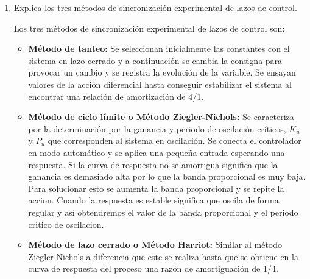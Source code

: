 \documentclass[10pt,a4paper,spanish]{article}
\begin{document}
\begin{enumerate}
    \item Explica los tres métodos de sincronización experimental de lazos de control.

    \noindent
    Los tres métodos de sincronización experimental de lazos de control son:

    \begin{itemize}
      \item \textbf{Método de tanteo:} Se seleccionan inicialmente las constantes con el sistema en lazo cerrado y a continuación se cambia la consigna para provocar un cambio y se registra la evolución de la variable. Se ensayan valores de la acción diferencial hasta conseguir estabilizar el sistema al encontrar una relación de amortización de 4/1.

      \item \textbf{Método de ciclo límite o Método Ziegler-Nichols:} Se caracteriza por la determinación por la ganancia y periodo de oscilación críticos, $K_u$ y $P_u$ que corresponden al sistema en oscilación. Se conecta el controlador en modo automático y se aplica una pequeña entrada esperando una respuesta. Si la curva de respuesta no se amortigua significa que la ganancia es demasiado alta por lo que la banda proporcional es muy baja. Para solucionar esto se aumenta la banda proporcional y se repite la accion. Cuando la respuesta es estable significa que oscila de forma regular y así obtendremos el valor de la banda proporcional y el periodo critico de oscilacion.

      \item \textbf{Método de lazo cerrado o Método Harriot:} Similar al método Ziegler-Nichols a diferencia que este se realiza hasta que se obtiene en la curva de respuesta del proceso una razón de amortiguación de 1/4.
    \end{itemize}

  \end{enumerate}
\end{document}
